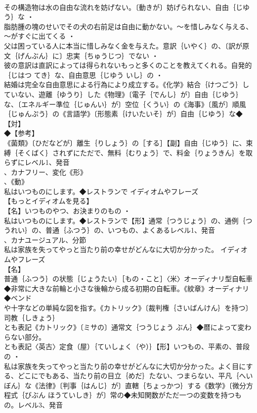 \documentclass[8pt]{extreport}
\begin{document}
\begin{CJK}{UTF8}{min}
\\	その構造物は水の自由な流れを妨げない。〔動きが〕妨げられない、自由｛じゆう｝な ・
\\	脂肪腫の塊のせいでその犬の右前足は自由に動かない。～を惜しみなく与える、～がすぐに出てくる ・
\\	父は困っている人に本当に惜しみなく金を与えた。意訳｛いやく｝の、〔訳が原文｛げんぶん｝に〕忠実｛ちゅうじつ｝でない ・
\\	彼の意訳は直訳によっては得られないもっと多くのことを教えてくれる。自発的｛じはつ てき｝な、自由意思｛じゆう いし｝の ・
\\	結婚は完全な自由意思による行為により成立する。《化学》結合｛けつごう｝していない、遊離｛ゆうり｝した《物理》〔電子｛でんし｝が〕自由｛じゆう｝な、〔エネルギー準位｛じゅんい｝が〕空位｛くうい｝の《海事》〔風が〕順風｛じゅんぷう｝の《言語学》〔形態素｛けいたいそ｝が〕自由｛じゆう｝な◆【対】
\\	◆【参考】
\\	《菌類》〔ひだなどが〕離生｛りしょう｝の［する］【副】自由｛じゆう｝に、束縛｛そくばく｝されずにただで、無料｛むりょう｝で、料金｛りょうきん｝を取らずにレベル1、発音
\\	、カナフリー、変化《形》
\\	、《動》
\\	私はいつものにします。◆レストランで	イディオムやフレーズ 
\\	【もっとイディオムを見る】
\\	【名】いつものやつ、お決まりのもの ・
\\	私はいつものにします。◆レストランで【形】通常｛つうじょう｝の、通例｛つうれい｝の、普通｛ふつう｝の、いつもの、よくあるレベル1、発音
\\	、カナユージュアル、分節
\\	私は家族を失ってやっと当たり前の幸せがどんなに大切か分かった。	イディオムやフレーズ 
\\	【名】
\\	普通｛ふつう｝の状態｛じょうたい｝［もの・こと］〈米〉オーディナリ型自転車◆非常に大きな前輪と小さな後輪から成る初期の自転車。《紋章》オーディナリ◆ベンド
\\	や十字などの単純な図を指す。《カトリック》〔裁判権｛さいばんけん｝を持つ〕司教｛しきょう｝
\\	とも表記《カトリック》〔ミサの〕通常文｛つうじょう ぶん｝◆暦によって変わらない部分。
\\	とも表記〈英古〉定食（屋）｛ていしょく（や）｝【形】いつもの、平素の、普段の ・
\\	私は家族を失ってやっと当たり前の幸せがどんなに大切か分かった。よく目にする、どこにでもある、当たり前の目立｛めだ｝たない、つまらない、平凡｛へいぼん｝な《法律》〔判事｛はんじ｝が〕直轄｛ちょっかつ｝する《数学》〔微分方程式｛びぶん ほうていしき｝が〕常の◆未知関数がただ一つの変数を持つもの。レベル3、発音

\end{CJK}
\end{document}
